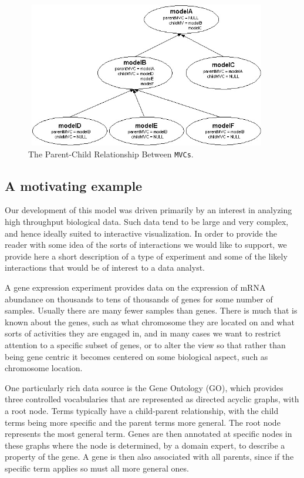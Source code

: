\documentclass[11pt]{article}
\newcommand{\Robject}[1]{{\texttt{#1}}}
\begin{document}
\begin{figure}[ht]
  \begin{center}
    \includegraphics[height=2.5in, width=4.2in]{Hierarchy2.jpg}
    \caption{ The Parent-Child Relationship Between \Robject{MVCs}. }
    \label{Fig:Hier}
  \end{center}
\end{figure}

\subsection*{A motivating example}
\label{sec:micro}

Our development of this model was driven primarily by an interest in
analyzing high throughput biological data.  Such data tend to be large
and very complex, and hence ideally suited to interactive
visualization.  In order to provide the reader with some idea of the
sorts of interactions we would like to support, we provide here a short
description of a type of experiment and some of the likely
interactions that would be of interest to a data analyst.

A gene expression experiment provides data on the expression of mRNA
abundance on thousands to tens of thousands of genes for some number
of samples. Usually there are many fewer samples than genes. There is
much that is known about the genes, such as what chromosome they are
located on and what sorts of activities they are engaged in, and in many
cases we want to restrict attention to a specific subset of genes, or
to alter the view so that rather than being gene centric it becomes
centered on some biological aspect, such as chromosome location.

One particularly rich data source is the Gene Ontology (GO), \cite{GO}
which provides three controlled vocabularies that are represented as
directed acyclic graphs, with a root node. Terms typically have a
child-parent relationship, with the child terms being more specific
and the parent terms more general. The root node represents the most
general term. Genes are then annotated at specific nodes in these
graphs where the node is determined, by a domain expert, to describe a
property of the gene. A gene is then also associated with all parents,
since if the specific term applies so must all more general ones.
\end{document}
